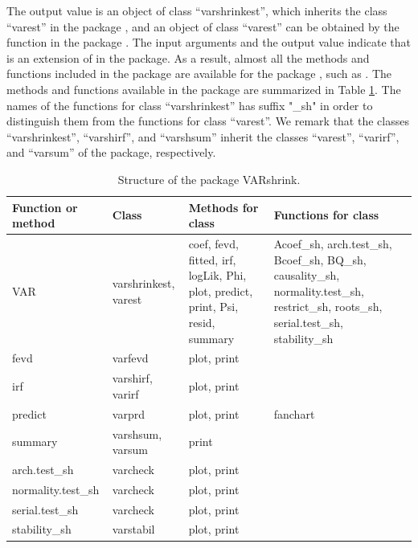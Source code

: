 \documentclass[
]{jss}
\begin{document}
The output value is an object of class ``varshrinkest'', which inherits
the class ``varest'' in the package , and an object of class
``varest'' can be obtained by the function  in the package
. The input arguments and the output value indicate that
 is an extension of  in the 
package. As a result, almost all the methods and functions included in
the package  are available for the package ,
such as . The methods and functions
available in the  package are summarized in Table
\ref{tab:methods}. The names of the functions for class ``varshrinkest''
has suffix "\_sh" in order to distinguish them from the functions for
class ``varest''. We remark that the classes ``varshrinkest'',
``varshirf'', and ``varshsum'' inherit the classes ``varest'',
``varirf'', and ``varsum'' of the  package, respectively.

\begin{CodeChunk}
\begin{table}[t]

\caption{\label{tab:unnamed-chunk-1}\label{tab:methods}Structure of the package VARshrink.}
\centering
\begin{tabular}{>{\raggedright\arraybackslash}p{7em}|>{\raggedright\arraybackslash}p{7em}|>{\raggedright\arraybackslash}p{7em}|>{\raggedright\arraybackslash}p{7em}}
\hline
Function or method & Class & Methods for class & Functions for class\\
\hline
VAR & varshrinkest, varest & coef, fevd, fitted, irf, logLik, Phi, plot, predict, print, Psi, resid, summary & Acoef\_sh, arch.test\_sh, Bcoef\_sh, BQ\_sh, causality\_sh, normality.test\_sh, restrict\_sh, roots\_sh, serial.test\_sh, stability\_sh\\
\hline
fevd & varfevd & plot, print & \\
\hline
irf & varshirf, varirf & plot, print & \\
\hline
predict & varprd & plot, print & fanchart\\
\hline
summary & varshsum, varsum & print & \\
\hline
arch.test\_sh & varcheck & plot, print & \\
\hline
normality.test\_sh & varcheck & plot, print & \\
\hline
serial.test\_sh & varcheck & plot, print & \\
\hline
stability\_sh & varstabil & plot, print & \\
\hline
\end{tabular}
\end{table}

\end{CodeChunk}
\end{document}
